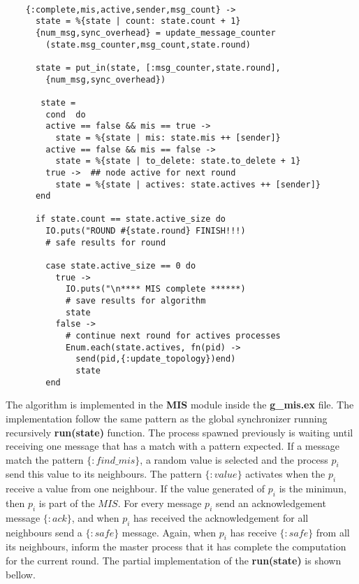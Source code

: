  
\begin{lstlisting}[frame=single]

    {:complete,mis,active,sender,msg_count} ->
      state = %{state | count: state.count + 1}
      {num_msg,sync_overhead} = update_message_counter
        (state.msg_counter,msg_count,state.round)

      state = put_in(state, [:msg_counter,state.round],
        {num_msg,sync_overhead})

       state =
        cond  do
        active == false && mis == true ->  
          state = %{state | mis: state.mis ++ [sender]}
        active == false && mis == false ->
          state = %{state | to_delete: state.to_delete + 1}
        true ->  ## node active for next round
          state = %{state | actives: state.actives ++ [sender]}
      end

      if state.count == state.active_size do
        IO.puts("ROUND #{state.round} FINISH!!!)
        # safe results for round
        
        case state.active_size == 0 do
          true ->
            IO.puts("\n**** MIS complete ******)
            # save results for algorithm
            state
          false ->
            # continue next round for actives processes
            Enum.each(state.actives, fn(pid) ->
              send(pid,{:update_topology})end)
              state
        end

\end{lstlisting}

The algorithm is implemented in the \textbf{MIS} module inside the \textbf{g\_mis.ex} file. The implementation follow the same pattern as the global synchronizer running recursively \textbf{run(state)} function. The process spawned previously is waiting until receiving one message that has a match with a pattern expected. If a message match the pattern $\{:find\_mis\}$, a random value is selected and the process $p_i$ send this value to its neighbours. The pattern $\{:value\}$  activates when the $p_i$ receive a value from one neighbour. If the value generated of $p_i$ is the minimun, then $p_i$ is part of the $MIS$. For every message $p_i$ send an acknowledgement message $\{:ack\}$, and when $p_i$ has received the acknowledgement for all neighbours send a $\{:safe\}$ message. Again, when $p_i$ has receive  $\{:safe\}$ from all its neighbours, inform the master process that it has complete the computation for the current round. The partial implementation of the \textbf{run(state)} is shown bellow. 

